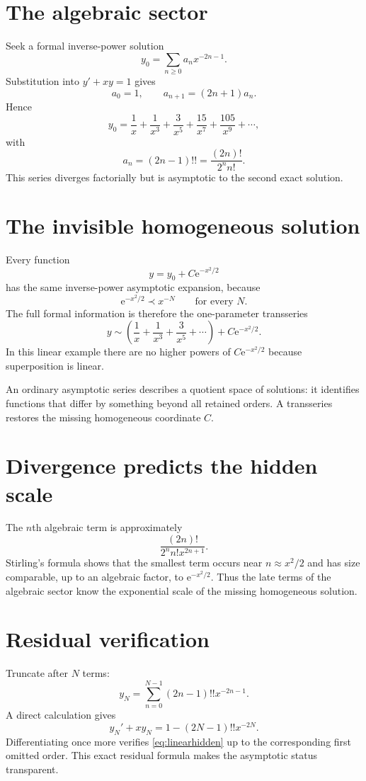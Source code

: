 \documentclass[11pt,openany]{book}
\theoremstyle{plain}
\theoremstyle{definition}
\theoremstyle{remark}
\newcommand{\e}{\mathrm{e}}
\begin{document}
\section{The algebraic sector}
Seek a formal inverse-power solution
\[
  y_0=\sum_{n\ge0}a_nx^{-2n-1}.
\]
Substitution into $y'+xy=1$ gives
\[
  a_0=1,
  \qquad
  a_{n+1}=(2n+1)a_n.
\]
Hence
\[
  y_0=\frac1x+\frac1{x^3}+\frac3{x^5}
      +\frac{15}{x^7}+\frac{105}{x^9}+\cdots,
\]
with
\[
  a_n=(2n-1)!!=\frac{(2n)!}{2^nn!}.
\]
This series diverges factorially but is asymptotic to the second exact solution.

\section{The invisible homogeneous solution}
Every function
\[
  y=y_0+C\e^{-x^2/2}
\]
has the same inverse-power asymptotic expansion, because
\[
  \e^{-x^2/2}\prec x^{-N}
  \qquad\text{for every }N.
\]
The full formal information is therefore the one-parameter transseries
\[
  y\sim
  \left(\frac1x+\frac1{x^3}+\frac3{x^5}+\cdots\right)
  +C\e^{-x^2/2}.
\]
In this linear example there are no higher powers of $C\e^{-x^2/2}$ because superposition is linear.

\begin{ideabox}
An ordinary asymptotic series describes a quotient space of solutions: it identifies functions that differ by something beyond all retained orders. A transseries restores the missing homogeneous coordinate $C$.
\end{ideabox}

\section{Divergence predicts the hidden scale}
The $n$th algebraic term is approximately
\[
  \frac{(2n)!}{2^nn!x^{2n+1}}.
\]
Stirling's formula shows that the smallest term occurs near $n\approx x^2/2$ and has size comparable, up to an algebraic factor, to $\e^{-x^2/2}$. Thus the late terms of the algebraic sector know the exponential scale of the missing homogeneous solution.

\section{Residual verification}
Truncate after $N$ terms:
\[
  y_N=\sum_{n=0}^{N-1}(2n-1)!!x^{-2n-1}.
\]
A direct calculation gives
\[
  y_N'+xy_N=1-(2N-1)!!x^{-2N}.
\]
Differentiating once more verifies \cref{eq:linearhidden} up to the corresponding first omitted order. This exact residual formula makes the asymptotic status transparent.
\end{document}
